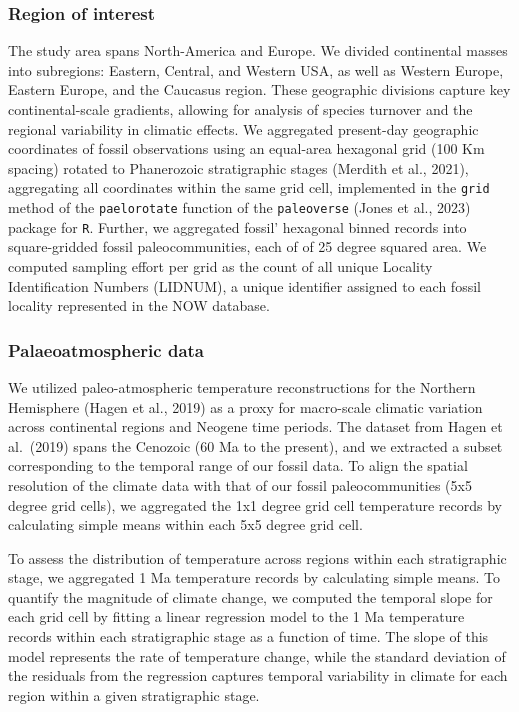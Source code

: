 \documentclass[
]{agujournal2019}
\begin{document}
\subsubsection{Region of interest}\label{region-of-interest}

The study area spans North-America and Europe. We divided continental
masses into subregions: Eastern, Central, and Western USA, as well as
Western Europe, Eastern Europe, and the Caucasus region. These
geographic divisions capture key continental-scale gradients, allowing
for analysis of species turnover and the regional variability in
climatic effects. We aggregated present-day geographic coordinates of
fossil observations using an equal-area hexagonal grid (100 Km spacing)
rotated to Phanerozoic stratigraphic stages (Merdith et al., 2021),
aggregating all coordinates within the same grid cell, implemented in
the \texttt{grid} method of the \texttt{paelorotate} function of the
\texttt{paleoverse} (Jones et al., 2023) package for \texttt{R}.
Further, we aggregated fossil' hexagonal binned records into
square-gridded fossil paleocommunities, each of of 25 degree squared
area. We computed sampling effort per grid as the count of all unique
Locality Identification Numbers (LIDNUM), a unique identifier assigned
to each fossil locality represented in the NOW database.

\subsubsection{Palaeoatmospheric data}\label{palaeoatmospheric-data}

We utilized paleo-atmospheric temperature reconstructions for the
Northern Hemisphere (Hagen et al., 2019) as a proxy for macro-scale
climatic variation across continental regions and Neogene time periods.
The dataset from Hagen et al.~(2019) spans the Cenozoic (60 Ma to the
present), and we extracted a subset corresponding to the temporal range
of our fossil data. To align the spatial resolution of the climate data
with that of our fossil paleocommunities (5x5 degree grid cells), we
aggregated the 1x1 degree grid cell temperature records by calculating
simple means within each 5x5 degree grid cell.

To assess the distribution of temperature across regions within each
stratigraphic stage, we aggregated 1 Ma temperature records by
calculating simple means. To quantify the magnitude of climate change,
we computed the temporal slope for each grid cell by fitting a linear
regression model to the 1 Ma temperature records within each
stratigraphic stage as a function of time. The slope of this model
represents the rate of temperature change, while the standard deviation
of the residuals from the regression captures temporal variability in
climate for each region within a given stratigraphic stage.
\end{document}
